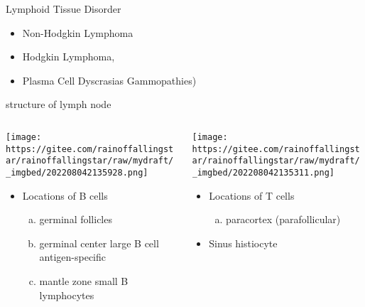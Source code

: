 \documentclass[
  ignorenonframetext,
]{beamer}
\providecommand{\tightlist}{%
  \setlength{\itemsep}{0pt}\setlength{\parskip}{0pt}}
\begin{document}
\begin{frame}
\begin{block}{Lymphoid Tissue Disorder}
\protect\hypertarget{lymphoid-tissue-disorder}{}
\begin{itemize}
\item
  Non-Hodgkin Lymphoma
\item
  Hodgkin Lymphoma,
\item
  Plasma Cell Dyscrasias Gammopathies)
\end{itemize}
\end{block}
\end{frame}

\begin{frame}
\begin{block}{structure of lymph node}
\protect\hypertarget{structure-of-lymph-node}{}
\begin{columns}[T]
\begin{column}{0.5\textwidth}
\texttt{[image: https://gitee.com/rainoffallingstar/rainoffallingstar/raw/mydraft/\_imgbed/202208042135928.png]}

\begin{itemize}
\item
  Locations of B cells

  \begin{enumerate}
  [a.]
  \item
    germinal follicles
  \item
    germinal center large B cell antigen-specific
  \item
    mantle zone small B lymphocytes
  \end{enumerate}
\end{itemize}
\end{column}

\begin{column}{0.5\textwidth}
\texttt{[image: https://gitee.com/rainoffallingstar/rainoffallingstar/raw/mydraft/\_imgbed/202208042135311.png]}

\begin{itemize}
\item
  Locations of T cells

  \begin{enumerate}
  [a.]
  \tightlist
  \item
    paracortex (parafollicular)
  \end{enumerate}
\item
  Sinus histiocyte
\end{itemize}
\end{column}
\end{columns}
\end{block}
\end{frame}
\end{document}
